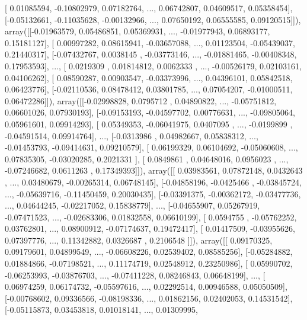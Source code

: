 \documentclass{article}
\begin{document}
       [ 0.01085594, -0.10802979,  0.07182764, ...,  0.06742807,
         0.04609517,  0.05358454],
       [-0.05132661, -0.11035628, -0.00132966, ...,  0.07650192,
         0.06555585,  0.09120515]]), array([[-0.01963579,  0.05486851,  0.05369931, ..., -0.01977943,
         0.06893177,  0.15181127],
       [ 0.00997282,  0.08615941, -0.03657088, ...,  0.01123504,
        -0.05439037,  0.21440317],
       [-0.07432767,  0.0038145 , -0.03773146, ..., -0.01881465,
        -0.00408348,  0.17953593],
       ..., 
       [ 0.0219309 ,  0.01814812,  0.0062333 , ..., -0.00526179,
         0.02103161,  0.04106262],
       [ 0.08590287,  0.00903547, -0.03373996, ...,  0.04396101,
         0.05842518,  0.06423776],
       [-0.02110536,  0.08478412,  0.03801785, ...,  0.07054207,
        -0.01000511,  0.06472286]]), array([[-0.02998828,  0.0795712 ,  0.04890822, ..., -0.05751812,
         0.06601026,  0.07930193],
       [-0.09153193, -0.04597702,  0.00776631, ..., -0.09805064,
         0.05961601,  0.09914293],
       [ 0.05349353, -0.06041975,  0.0407095 , ..., -0.0199899 ,
        -0.04591514,  0.09914764],
       ..., 
       [-0.0313986 ,  0.04982667,  0.05838312, ..., -0.01453793,
        -0.09414631,  0.09210579],
       [ 0.06199329,  0.06104692, -0.05060608, ...,  0.07835305,
        -0.03020285,  0.2021331 ],
       [ 0.0849861 ,  0.04648016,  0.0956023 , ..., -0.07246682,
         0.0611263 ,  0.17349393]]), array([[ 0.03983561,  0.07872148,  0.0432643 , ...,  0.03480679,
        -0.00265314,  0.06748145],
       [-0.04858196, -0.0425466 , -0.03845724, ..., -0.05639716,
        -0.11450459,  0.20030435],
       [-0.03391375, -0.00362172, -0.03477736, ...,  0.04644245,
        -0.02217052,  0.15838779],
       ..., 
       [-0.04655907,  0.05267919, -0.07471523, ..., -0.02683306,
         0.01832558,  0.06610199],
       [ 0.0594755 , -0.05762252,  0.03762801, ...,  0.08900912,
        -0.07174637,  0.19472417],
       [ 0.01417509, -0.03955626,  0.07397776, ...,  0.11342882,
         0.0326687 ,  0.2106548 ]]), array([[ 0.09170325,  0.09179601,  0.04899549, ..., -0.06608226,
         0.02539402,  0.08585256],
       [-0.05284882,  0.01884866, -0.07198521, ...,  0.11174719,
         0.02548912,  0.23250986],
       [ 0.05990702, -0.06253993, -0.03876703, ..., -0.07411228,
         0.08246843,  0.06648199],
       ..., 
       [ 0.06974259,  0.06174732, -0.05597616, ...,  0.02292514,
         0.00946588,  0.05050509],
       [-0.00768602,  0.09336566, -0.08198336, ...,  0.01862156,
         0.02402053,  0.14531542],
       [-0.05115873,  0.03453818,  0.01018141, ...,  0.01309995,
\end{document}
